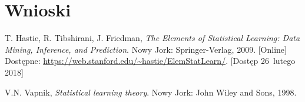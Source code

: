 \documentclass[11pt,a4paper]{article}
\begin{document}
\section{Wnioski}


\begin{thebibliography}{9}

        T. Hastie,
        R. Tibshirani,
        J. Friedman,
        \emph{The Elements of Statistical Learning: Data Mining, Inference, and Prediction}.
        Nowy Jork: Springer-Verlag,
        2009.
        [Online] \\
        Dostępne: \url{https://web.stanford.edu/~hastie/ElemStatLearn/}.
        [Dostęp 26~lutego 2018]

        V.N. Vapnik,
        \emph{Statistical learning theory}.
        Nowy Jork: John Wiley and Sons,
        1998.

\end{thebibliography}
\end{document}
